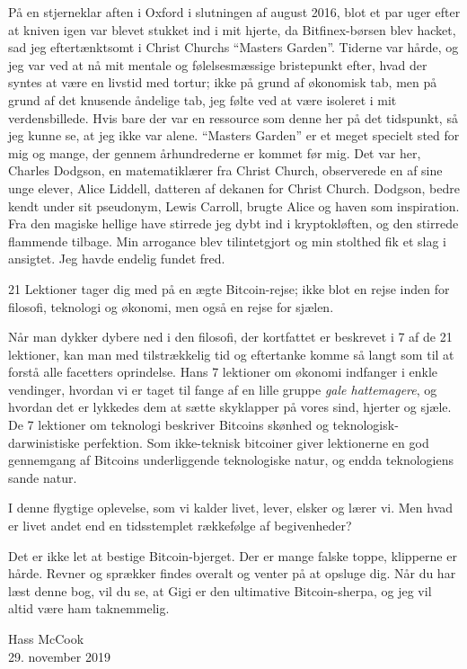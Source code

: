 \documentclass[paper=6in:9in,pagesize=pdftex,
               headinclude=on,footinclude=on,12pt]{scrbook}
\begin{document}
På en stjerneklar aften i Oxford i slutningen af august 2016, blot et par uger efter at kniven igen var blevet stukket ind i mit hjerte, da Bitfinex-børsen blev hacket, sad jeg eftertænktsomt i Christ Churchs \enquote{Masters Garden}. Tiderne var hårde, og jeg var ved at nå mit mentale og følelsesmæssige bristepunkt efter, hvad der syntes at være en livstid med tortur; ikke på grund af økonomisk tab, men på grund af det knusende åndelige tab, jeg følte ved at være isoleret i mit verdensbillede. Hvis bare der var en ressource som denne her på det tidspunkt, så jeg kunne se, at jeg ikke var alene. \enquote{Masters Garden} er et meget specielt sted for mig og mange, der gennem århundrederne er kommet før mig. Det var her, Charles Dodgson, en matematiklærer fra Christ Church, observerede en af sine unge elever, Alice Liddell, datteren af dekanen for Christ Church. Dodgson, bedre kendt under sit pseudonym, Lewis Carroll, brugte Alice og haven som inspiration. Fra den magiske hellige have stirrede jeg dybt ind i kryptokløften, og den stirrede flammende tilbage. Min arrogance blev tilintetgjort og min stolthed fik et slag i ansigtet. Jeg havde endelig fundet fred.

21 Lektioner tager dig med på en ægte Bitcoin-rejse; ikke blot en rejse inden for filosofi, teknologi og økonomi, men også en rejse for sjælen.

Når man dykker dybere ned i den filosofi, der kortfattet er beskrevet i 7 af de 21 lektioner, kan man med tilstrækkelig tid og eftertanke komme så langt som til at forstå alle facetters oprindelse. Hans 7 lektioner om økonomi indfanger i enkle vendinger, hvordan vi er taget til fange af en lille gruppe \textit{gale hattemagere}, og hvordan det er lykkedes dem at sætte skyklapper på vores sind, hjerter og sjæle. De 7 lektioner om teknologi beskriver Bitcoins skønhed og teknologisk-darwinistiske perfektion. Som ikke-teknisk bitcoiner giver lektionerne en god gennemgang af Bitcoins underliggende teknologiske natur, og endda teknologiens sande natur.

I denne flygtige oplevelse, som vi kalder livet, lever, elsker og lærer vi. Men hvad er livet andet end en tidsstemplet rækkefølge af begivenheder?

Det er ikke let at bestige Bitcoin-bjerget. Der er mange falske toppe, klipperne er hårde. Revner og sprækker findes overalt og venter på at opsluge dig. Når du har læst denne bog, vil du se, at Gigi er den ultimative Bitcoin-sherpa, og jeg vil altid være ham taknemmelig.\begin{flushright} Hass McCook \\ 29. november 2019 \end{flushright}
\end{document}
